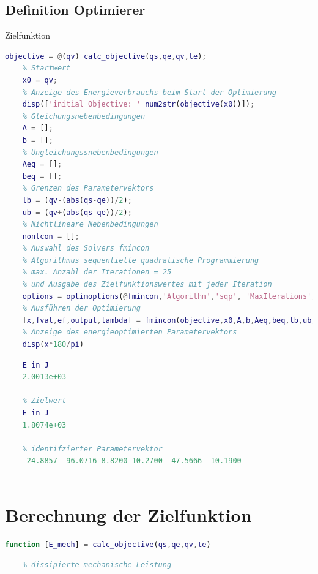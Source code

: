 \subsection{Definition Optimierer}
%
\begin{par}
	Zielfunktion
\end{par} \vspace{1em}
\begin{lstlisting}[language=Matlab, numbers=none]
	objective = @(qv) calc_objective(qs,qe,qv,te);
	% Startwert
	x0 = qv;
	% Anzeige des Energieverbrauchs beim Start der Optimierung
	disp(['initial Objective: ' num2str(objective(x0))]);
	% Gleichungsnebenbedingungen
	A = [];
	b = [];
	% Ungleichungssnebenbedingungen
	Aeq = [];
	beq = [];
	% Grenzen des Parametervektors
	lb = (qv-(abs(qs-qe))/2);
	ub = (qv+(abs(qs-qe))/2);
	% Nichtlineare Nebenbedingungen
	nonlcon = [];
	% Auswahl des Solvers fmincon
	% Algorithmus sequentielle quadratische Programmierung
	% max. Anzahl der Iterationen = 25
	% und Ausgabe des Zielfunktionswertes mit jeder Iteration
	options = optimoptions(@fmincon,'Algorithm','sqp', 'MaxIterations', 25,'PlotFcn',@optimplotfval);
	% Ausführen der Optimierung
	[x,fval,ef,output,lambda] = fmincon(objective,x0,A,b,Aeq,beq,lb,ub,nonlcon,options);
	% Anzeige des energieoptimierten Parametervektors
	disp(x*180/pi)
\end{lstlisting}
\color{lightgray} \begin{lstlisting}[language=Matlab, numbers=none]
	% Startwert
	E in J
	2.0013e+03
	
	% Zielwert
	E in J
	1.8074e+03
	
	% identifzierter Parametervektor
	-24.8857 -96.0716 8.8200 10.2700 -47.5666 -10.1900
	
\end{lstlisting} \color{black}
%
%
%
\setcounter{section}{6}
\section{Berechnung der Zielfunktion}
%
\label{add:zielfunktion}
\begin{lstlisting}[language=Matlab, numbers=none]
	function [E_mech] = calc_objective(qs,qe,qv,te)
\end{lstlisting}
\begin{lstlisting}[language=Matlab, numbers=none]
	% Berechung der Zielfunktion (Energieverbrauch) über die nicht
	% dissipierte mechanische Leistung
\end{lstlisting}
%
